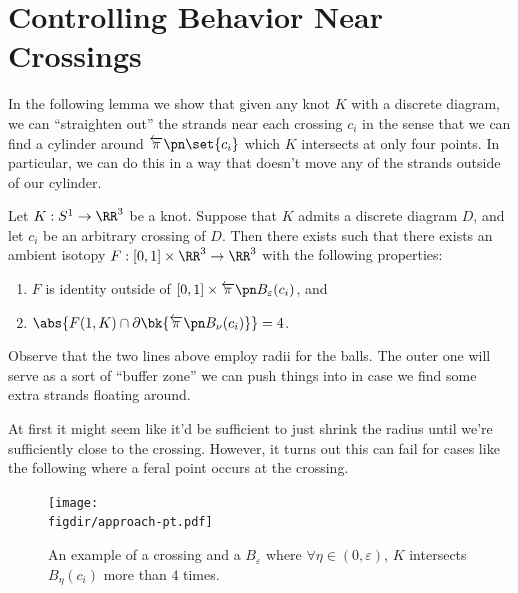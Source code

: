 

\section{Controlling Behavior Near
  Crossings}\label{sec:controlling-behavior-near-crossings}
\def\figdir{figures/wild/controlling-crossings}

In the following lemma we show that given any knot $K$ with a discrete
diagram, we can ``straighten out'' the strands near each crossing
$c_i$ in the sense that we can find a cylinder around
$\fpre{\pi}{\set{c_i}}$ which $K$ intersects at only four points. In
particular, we can do this in a way that doesn't move any of the
strands outside of our cylinder.
\begin{theorem}\label{thm:cleaning-up-near-crossings}
  Let $K : S^1 \to \RR^3$ be a knot. Suppose that $K$ admits a
  discrete diagram $D$, and let $c_i$ be an arbitrary crossing of $D$.
  Then there exists  such that
  there exists an ambient isotopy $F : [0,1] \times \RR^3 \to \RR^3$
  with the following properties:
  \begin{enumerate}[label=(\roman*)]
    \item $F$ is identity outside of $[0,1] \times
      \fpre{\pi}{B_{\varepsilon}(c_i)}$, and
    \item $\abs{F(1, K) \cap \partial \bk{\fpre{\pi}{B_{\nu}(c_i)}}}
      = 4$.
  \end{enumerate}
\end{theorem}
\begin{note}
  Observe that the two lines above employ radii for the balls. The
  outer one will serve as a sort of ``buffer zone'' we can push things
  into in case we find some extra strands floating around.
\end{note}
\begin{remark}
  At first it might seem like it'd be sufficient to just shrink the
  radius until we're sufficiently close to the crossing. However, it
  turns out this can fail for cases like the following where a feral
  point occurs at the crossing.
  \begin{figure}[H]
    \centering
    \texttt{[image: \\figdir/approach-pt.pdf]}
    \caption{An example of a crossing and a $B_{\varepsilon}$ where
      $\forall \eta \in (0, \varepsilon)$, $K$ intersects
      $B_{\eta}(c_i)$ more than $4$ times.}
    \label{fig:approach-pt}
  \end{figure}
\end{remark}
